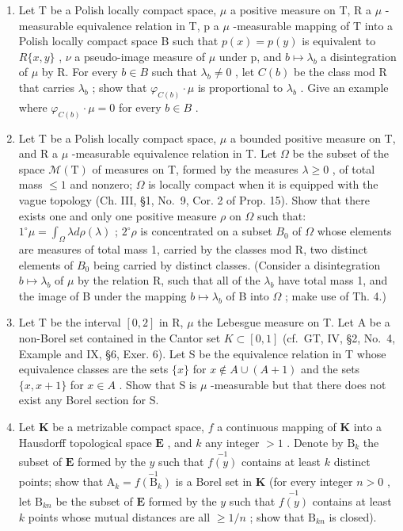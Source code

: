\begin{enumerate}
\item
  Let T be a Polish locally compact space, \(\mu\) a positive measure on T, R a \(\mu\) -measurable equivalence relation in T, p a \(\mu\) -measurable mapping of T into a Polish locally compact space B such that \(p(x) = p(y)\) is equivalent to \(R\{x, y\}\) , \(\nu\) a pseudo-image measure of \(\mu\) under p, and \(b \mapsto \lambda_b\) a disintegration of \(\mu\) by R. For every \(b \in B\) such that \(\lambda_b \neq 0\) , let \(C(b)\) be the class mod R that carries \(\lambda_b\) ; show that \(\varphi_{C(b)} \cdot \mu\) is proportional to \(\lambda_b\) . Give an example where \(\varphi_{C(b)} \cdot \mu = 0\) for every \(b \in B\) .
\item
  Let T be a Polish locally compact space, \(\mu\) a bounded positive measure on T, and R a \(\mu\) -measurable equivalence relation in T. Let \(\Omega\) be the subset of the space \(\mathcal{M}(\mathrm{T})\) of measures on T, formed by the measures \(\lambda \geqslant 0\) , of total mass \(\leqslant 1\) and nonzero; \(\Omega\) is locally compact when it is equipped with the vague topology (Ch. III, §1, No.~9, Cor. 2 of Prop. 15). Show that there exists one and only one positive measure \(\rho\) on \(\Omega\) such that: \(1^{\circ} \mu = \int_{\Omega} \lambda d\rho(\lambda)\) ; \(2^{\circ} \rho\) is concentrated on a subset \(B_{0}\) of \(\Omega\) whose elements are measures of total mass 1, carried by the classes mod R, two distinct elements of \(B_{0}\) being carried by distinct classes. (Consider a disintegration \(b \mapsto \lambda_{b}\) of \(\mu\) by the relation R, such that all of the \(\lambda_{b}\) have total mass 1, and the image of B under the mapping \(b \mapsto \lambda_{b}\) of B into \(\Omega\) ; make use of Th. 4.)
\item
  Let T be the interval \([0,2]\) in R, \(\mu\) the Lebesgue measure on T. Let A be a non-Borel set contained in the Cantor set \(K \subset [0,1]\) (cf.~GT, IV, §2, No.~4, Example and IX, §6, Exer. 6). Let S be the equivalence relation in T whose equivalence classes are the sets \(\{x\}\) for \(x \notin A \cup (A + 1)\) and the sets \(\{x, x + 1\}\) for \(x \in A\) . Show that S is \(\mu\) -measurable but that there does not exist any Borel section for S.
\item
  Let \(\mathbf{K}\) be a metrizable compact space, \(f\) a continuous mapping of \(\mathbf{K}\) into a Hausdorff topological space \(\mathbf{E}\) , and \(k\) any integer \(> 1\) . Denote by \(\mathrm{B}_k\) the subset of \(\mathbf{E}\) formed by the \(y\) such that \(\stackrel{-1}{f(y)}\) contains at least \(k\) distinct points; show that \(\mathrm{A}_k = \stackrel{-1}{f(\mathrm{B}_k)}\) is a Borel set in \(\mathbf{K}\) (for every integer \(n > 0\) , let \(\mathrm{B}_{kn}\) be the subset of \(\mathbf{E}\) formed by the \(y\) such that \(\stackrel{-1}{f(y)}\) contains at least \(k\) points whose mutual distances are all \(\geqslant 1/n\) ; show that \(\mathrm{B}_{kn}\) is closed).
\end{enumerate}

